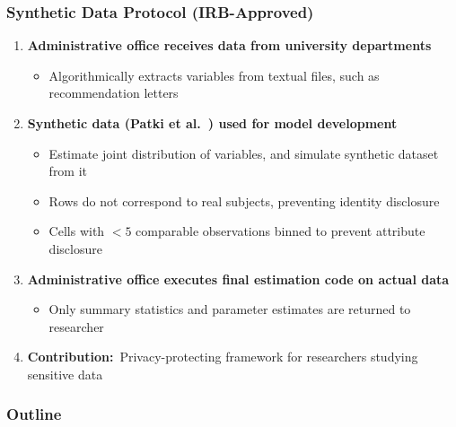 \documentclass[12pt, aspectratio=169]{beamer}
\begin{document}
\begin{frame}[label=sdp]
\frametitle{Synthetic Data Protocol (IRB-Approved)}
\begin{enumerate}
\item \textbf{Administrative office receives data from university departments}
\vspace{5pt}
\begin{itemize}
\item Algorithmically extracts variables from textual files, such as recommendation letters
\vspace{10pt}
\end{itemize}
\item \textbf{Synthetic data (Patki et al.\ \citeyear{patki2016}) used for model development}
\vspace{5pt}
\begin{itemize}
\item Estimate joint distribution of variables, and simulate synthetic dataset from it
\vspace{5pt}
\item Rows do not correspond to real subjects, preventing identity disclosure
\vspace{5pt}
\item Cells with $<5$ comparable observations binned to prevent attribute disclosure
\vspace{10pt}
\end{itemize}
\item \textbf{Administrative office executes final estimation code on actual data}
\vspace{5pt}
\begin{itemize}
\item Only summary statistics and parameter estimates are returned to researcher
\vspace{10pt}
\end{itemize}
\item[$\bigstar$] \textbf{Contribution:}\ Privacy-protecting framework for researchers studying sensitive data\!
\vspace{10pt}
\end{enumerate}
\hyperlink{sde}{}
\end{frame}

\begin{frame}
\frametitle{Outline}
\tableofcontents
\end{frame}
\end{document}
